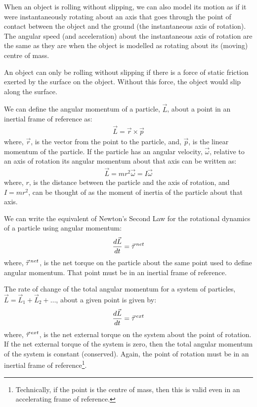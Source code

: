 \begin{chapterSummary}
When an object is rolling without slipping, we can also model its motion as if it were instantaneously rotating about an axis that goes through the point of contact between the object and the ground (the instantaneous axis of rotation). The angular speed (and acceleration) about the instantaneous axis of rotation are the same as they are when the object is modelled as rotating about its (moving) centre of mass. 

An object can only be rolling without slipping if there is a force of static friction exerted by the surface on the object. Without this force, the object would slip along the surface.

We can define the angular momentum of a particle, $\vec L$, about a point in an inertial frame of reference as:
\begin{align*}
\vec L = \vec r \times \vec p
\end{align*}
where, $\vec r$, is the vector from the point to the particle, and, $\vec p$, is the linear momentum of the particle. If the particle has an angular velocity, $\vec\omega$, relative to an axis of rotation its angular momentum about that axis can be written as:
\begin{align*}
\vec L = mr^2\vec\omega = I\vec\omega
\end{align*}
where, $r$, is the distance between the particle and the axis of rotation, and $I=mr^2$, can be thought of as the moment of inertia of the particle about that axis.

We can write the equivalent of Newton's Second Law for the rotational dynamics of a particle using angular momentum:
\begin{align*}
\frac{d\vec L}{dt}=\pvec\tau^{net}
\end{align*}
where, $\pvec \tau^{net}$, is the net torque on the particle about the same point used to define angular momentum. That point must be in an inertial frame of reference.

The rate of change of the total angular momentum for a system of particles, $\vec L=\vec L_1 + \vec L_2 +\dots$, about a given point is given by:
\begin{align*}
\frac{d\vec L}{dt}=\pvec\tau^{ext}
\end{align*}
where, $\pvec\tau^{ext}$, is the net external torque on the system about the point of rotation. If the net external torque of the system is zero, then the total angular momentum of the system is constant (conserved). Again, the point of rotation must be in an inertial frame of reference\footnote{Technically, if the point is the centre of mass, then this is valid even in an accelerating frame of reference.}.


\end{chapterSummary}
